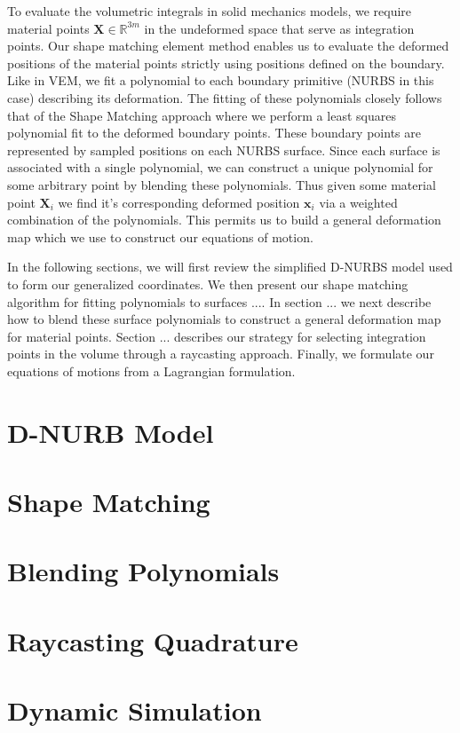 To evaluate the volumetric integrals in solid mechanics models, we require material points $\mathbf{X} \in \mathbb{R}^{3m}$ in the undeformed space that serve as integration points. Our shape matching element method enables us to evaluate the deformed positions of the material points strictly using positions defined on the boundary. Like in VEM, we fit a polynomial to each boundary primitive (NURBS in this case) describing its deformation. The fitting of these polynomials closely follows that of the Shape Matching \cite{10.1145/1073204.1073216} approach where we perform a least squares polynomial fit to the deformed boundary points. These boundary points are represented by sampled positions on each NURBS surface. Since each surface is associated with a single polynomial, we can construct a unique polynomial for some arbitrary point by blending these polynomials. Thus given some material point $\mathbf{X}_i$ we find it's corresponding deformed position $\mathbf{x}_i$ via a weighted combination of the polynomials. This permits us to build a general deformation map which we use to construct our equations of motion.

In the following sections, we will first review the simplified D-NURBS model used to form our generalized coordinates. We then present our shape matching algorithm for fitting polynomials to surfaces .... In section ... we next describe how to blend these surface polynomials to construct a general deformation map for material points. Section ... describes our strategy for selecting integration points in the volume through a raycasting approach. Finally, we formulate our equations of motions from a Lagrangian formulation.

\section{D-NURB Model}
\section{Shape Matching}
\section{Blending Polynomials}
\section{Raycasting Quadrature}
\section{Dynamic Simulation}
